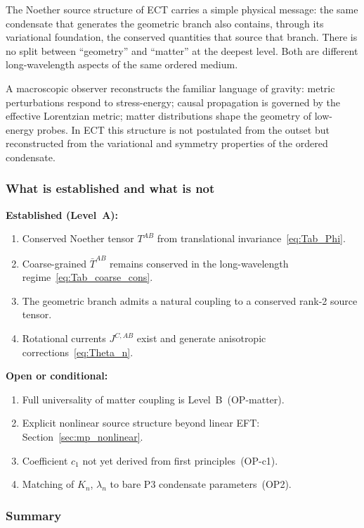 The Noether source structure of ECT carries a simple physical message:
the same condensate that generates the geometric branch also contains,
through its variational foundation, the conserved quantities that source
that branch.
There is no split between ``geometry'' and ``matter'' at the deepest
level.
Both are different long-wavelength aspects of the same ordered medium.

A macroscopic observer reconstructs the familiar language of gravity:
metric perturbations respond to stress-energy; causal propagation is
governed by the effective Lorentzian metric; matter distributions shape
the geometry of low-energy probes.
In ECT this structure is not postulated from the outset but
reconstructed from the variational and symmetry properties of the
ordered condensate.

\subsubsection*{What is established and what is not}

\textbf{Established (Level~A):}
\begin{enumerate}[label=(\roman*)]
  \item Conserved Noether tensor $T^{AB}$ from translational
    invariance~\eqref{eq:Tab_Phi}.
  \item Coarse-grained $\bar{T}^{AB}$ remains conserved in the
    long-wavelength regime~\eqref{eq:Tab_coarse_cons}.
  \item The geometric branch admits a natural coupling to a
    conserved rank-2 source tensor.
  \item Rotational currents $J^{C,AB}$ exist and generate
    anisotropic corrections~\eqref{eq:Theta_n}.
\end{enumerate}

\textbf{Open or conditional:}
\begin{enumerate}[label=(\roman*)]
  \item Full universality of matter coupling is Level~B~(OP-matter).
  \item Explicit nonlinear source structure beyond linear EFT:
    Section~\ref{sec:mp_nonlinear}.
  \item Coefficient $c_1$ not yet derived from first principles~(OP-c1).
  \item Matching of $K_n$, $\lambda_n$ to bare P3 condensate
    parameters~(OP2).
\end{enumerate}

\subsubsection*{Summary}

